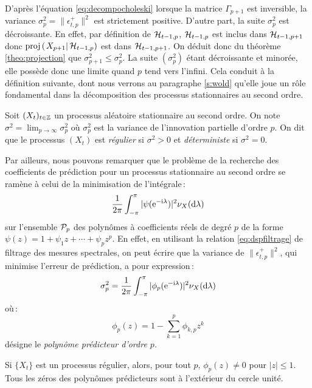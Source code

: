 D'apr\`es l'\'equation \eqref{eq:decompocholeski} lorsque la
matrice $\Gamma_{p+1}$ est inversible, la variance
$\sigma_p^2=\|\epsilon_{t,p}^+\|^2$ est strictement positive.
D'autre part, la suite $\sigma_p^2$ est
d\'ecroissante. En effet, par d\'efinition de $\mathcal{H}_{t-1,p}$,
$\mathcal{H}_{t-1,p}$ est inclus dans $\mathcal{H}_{t-1,p+1}$ donc
$\proj{X_{p+1}}{\cH_{t-1,p}}$ est dans $\mathcal{H}_{t-1,p+1}$.
On d\'eduit donc du th\'eor\`eme \ref{theo:projection} que $\sigma_{p+1}^2\leq\sigma_{p}^2$.
La suite $(\sigma_p^2)$ \'etant d\'ecroissante et minor\'ee, elle poss\`ede
donc une limite quand $p$ tend vers l'infini. Cela conduit \`a la d\'efinition suivante,
dont nous verrons au paragraphe \ref{s:wold} qu'elle joue un r\^ole
fondamental dans la d\'ecomposition des processus stationnaires au
second ordre.

\begin{definition}
 \label{def:paregulier}
 Soit $(X_t)_{t \in \mathbb{Z}}$ un processus al\'eatoire stationnaire au second
ordre. On note $\sigma^2=\lim_{p\to\infty}\sigma_p^2$ o\`u
$\sigma_p^2$ est la variance de l'innovation partielle
d'ordre $p$. On dit que le processus $(X_t)$ est \emph{r\'egulier} si
$\sigma^2 > 0$ et \emph{d\'eterministe} si $\sigma^2=0$.
\end{definition}


Par ailleurs, nous pouvons remarquer que le probl\`eme de la recherche des coefficients de pr\'ediction pour
un processus stationnaire au second ordre se ram\`ene \`a
celui de la minimisation de l'int\'egrale\,:
\[
   \frac{1}{2\pi}
             \int_{-\pi}^{\pi} |\psi(\mathrm{e}^{-\mathrm{i}\lambda})|^2 \nu_X(\mathrm{d}\lambda)
\]
sur l'ensemble $\mathcal{P}_p$ des polyn\^omes \`a coefficients r\'eels
de degr\'e $p$ de la forme $\psi(z) = 1 + \psi_1 z + \cdots + \psi_p
z^p$. En effet, en utilisant la relation \eqref{eq:dspfiltrage} de
filtrage des mesures spectrales, on peut \'ecrire que la variance de
$ \| \epsilon_{t,p}^+ \|^2$, qui minimise l'erreur de
pr\'ediction, a pour expression\,:
\begin{equation}
\label{eq:variance:innovation:partielle}
 \sigma_p^2
 = \frac{1}{2 \pi} \int_{-\pi}^{\pi} |
    \phi_p(\mathrm{e}^{-\mathrm{i}\lambda})|^2 \nu_X(\mathrm{d}\lambda)
\end{equation}
o\`u\,:
\[
  \phi_p(z) = 1 - \sum_{k=1}^p \phi_{k,p} z^k
\]
d\'esigne le \emph{polyn\^ome pr\'edicteur d'ordre $p$}.
\begin{theorem}
 \label{theo:procregulpredicstable}
 Si $\{ X_t \}$ est un processus r\'egulier, alors, pour
tout $p$, $\phi_p(z) \ne 0$ pour $|z|\leq 1$. Tous les z\'eros des
polyn\^omes pr\'edicteurs sont \`a l'ext\'erieur du cercle unit\'e.
\end{theorem}

